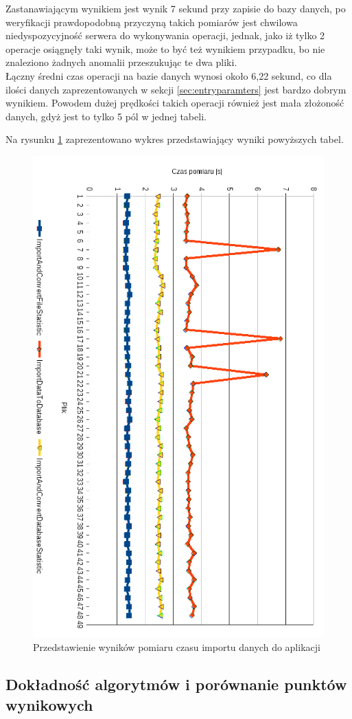 Zastanawiającym wynikiem jest wynik 7 sekund przy zapisie do bazy danych, po weryfikacji prawdopodobną przyczyną takich pomiarów jest chwilowa niedyspozycyjność serwera do wykonywania operacji, jednak, jako iż tylko 2 operacje osiągnęły taki wynik, może to być też wynikiem przypadku, bo nie znaleziono żadnych anomalii przeszukując te dwa pliki.\\
Łączny średni czas operacji na bazie danych wynosi około 6,22 sekund, co dla ilości danych zaprezentowanych w sekcji \ref{sec:entryparamters} jest bardzo dobrym wynikiem. Powodem dużej prędkości takich operacji również jest mała złożoność danych, gdyż jest to tylko 5 pól w jednej tabeli.\par
Na rysunku \ref{fig:importdata} zaprezentowano wykres przedstawiający wyniki powyższych tabel.
\newpage
\begin{figure}[H]
    \centering
    \captionsetup{justification=centering,margin=2cm}
    \includegraphics[width=\linewidth]{resources/statystyka_pomiaru.png}
    \caption{Przedstawienie wyników pomiaru czasu importu danych do aplikacji}
    \label{fig:importdata}
\end{figure}
\newpage
\subsection{Dokładność algorytmów i porównanie punktów wynikowych}